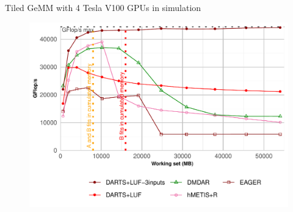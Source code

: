 \documentclass{libs/ufc_format}
\begin{document}
{%
\begin{frame}[noframenumbering]{Tiled GeMM with 4 Tesla V100 GPUs in simulation}
    \begin{figure}
        \centering
        \includegraphics[scale=0.5]{Images/GF_dynamic_data_aware_no_hfp_gemini-1-fgcs_4GPU_M3D.pdf}
    \end{figure}
\end{frame}

}
\end{document}
